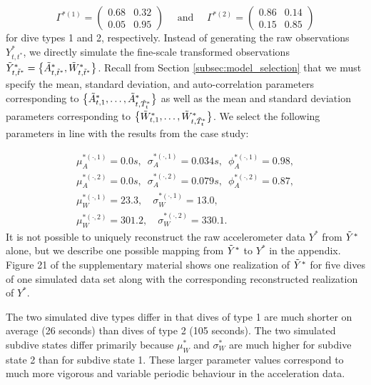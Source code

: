 \[\Gamma^{*(1)} = \begin{pmatrix} 0.68 & 0.32 \\ 0.05 & 0.95 \end{pmatrix} \quad \text{ and } \quad \Gamma^{*(2)} = \begin{pmatrix} 0.86 & 0.14 \\ 0.15 & 0.85 \end{pmatrix}\]
%
for dive types 1 and 2, respectively.
Instead of generating the raw observations $Y^*_{t,t^*}$, we directly simulate the fine-scale transformed observations $\tilde{Y}^*_{t,\tilde t^*} = \big\{\tilde{A}^*_{t,\tilde t^*}, \tilde{W}^*_{t,\tilde t^*}\big\}$. Recall from Section \ref{subsec:model_selection} that we must specify the mean, standard deviation, and auto-correlation parameters corresponding to $\big\{\tilde{A}^*_{t,1},\ldots,\tilde{A}^*_{t,\tilde T_t^*}\big\}$ as well as the mean and standard deviation parameters corresponding to $\big\{\tilde{W}^*_{t,1},\ldots,\tilde{W}^*_{t,\tilde T_t^*}\big\}$. We select the following parameters in line with the results from the case study:

\begin{gather*}
    \mu_A^{*(\cdot,1)} = 0.0 s, \enspace \sigma_A^{*(\cdot,1)} = 0.034s, \enspace \phi_A^{*(\cdot,1)} = 0.98, \\
    \mu_A^{*(\cdot,2)} = 0.0 s, \enspace \sigma_A^{*(\cdot,2)} = 0.079s, \enspace \phi_A^{*(\cdot,2)} = 0.87, \\
    \mu_W^{*(\cdot,1)} = 23.3, \quad \sigma_W^{*(\cdot,1)} = 13.0, \\
    \mu_W^{*(\cdot,2)} = 301.2, \quad \sigma_W^{*(\cdot,2)} = 330.1.
\end{gather*}
%
It is not possible to uniquely reconstruct the raw accelerometer data $Y^*$ from $\tilde{Y}^*$ alone, but we describe one possible mapping from $\tilde{Y}^*$ to $Y^*$ in the appendix. Figure 21 of the supplementary material shows one realization of $\tilde{Y}^*$ for five dives of one simulated data set along with the corresponding reconstructed realization of $Y^*$. 

The two simulated dive types differ in that dives of type 1 are much shorter on average (26 seconds) than dives of type 2 (105 seconds). The two simulated subdive states differ primarily because $\mu_W^*$ and $\sigma_W^*$ are much higher for subdive state 2 than for subdive state 1. These larger parameter values correspond to much more vigorous and variable periodic behaviour in the acceleration data. 

